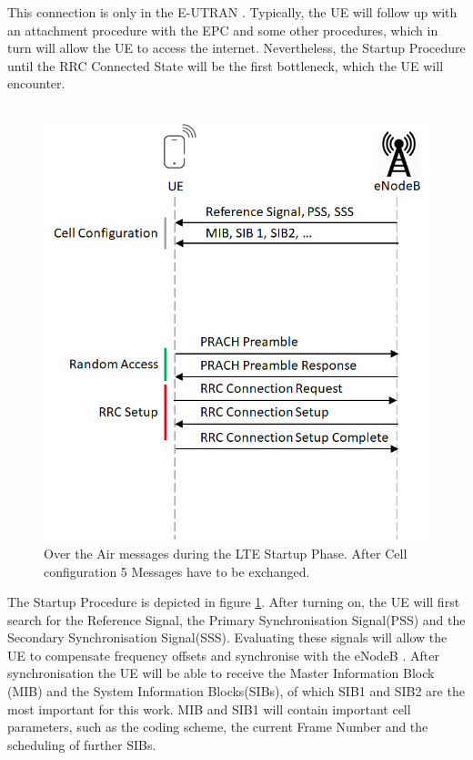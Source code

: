 \documentclass[conference]{IEEEtran}
\begin{document}
This connection is only in the E-UTRAN .
Typically, the UE will follow up with an attachment procedure with the EPC and some other procedures, which in turn will allow the UE to access the internet.
Nevertheless, the Startup Procedure until the RRC Connected State will be the first bottleneck, which the UE will encounter.\\\\
\begin{figure}
    \centering
    \includegraphics[width= \columnwidth]{../Figures/OtA_LTE_Startup.png}
    \caption{Over the Air messages during the LTE Startup Phase. After Cell configuration 5 Messages have to be exchanged.}
    \label{fig:OtA_LTE_Startup}
\end{figure}
The Startup Procedure is depicted in figure \ref{fig:OtA_LTE_Startup}.
After turning on, the UE will first search for the Reference Signal, the Primary Synchronisation Signal(PSS) and the Secondary Synchronisation Signal(SSS).
Evaluating these signals will allow the UE to compensate frequency offsets and synchronise with the eNodeB .
After synchronisation the UE will be able to receive the Master Information Block (MIB) and the System Information Blocks(SIBs), of which SIB1 and SIB2 are the most important for this work.
MIB and SIB1 will contain important cell parameters, such as the coding scheme, the current Frame Number and the scheduling of further SIBs.\\\\
\end{document}
